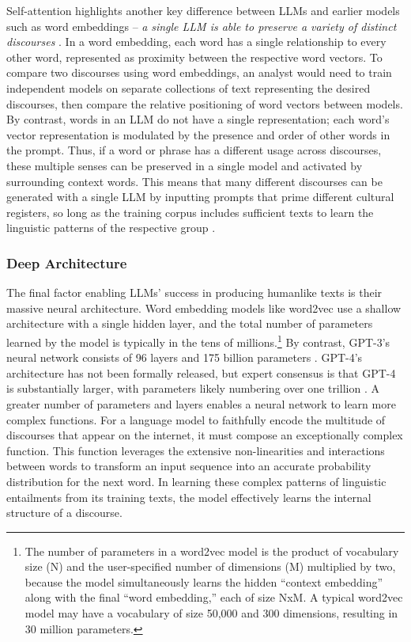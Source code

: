 \documentclass{article}
\begin{document}
Self-attention highlights another key difference between LLMs and
earlier models such as word embeddings -- \emph{a} \emph{single LLM is
able to preserve a variety of distinct discourses} \parencite{Argyle2023-ii}. In a
word embedding, each word has a single relationship to every other word,
represented as proximity between the respective word vectors. To compare
two discourses using word embeddings, an analyst would need to train
independent models on separate collections of text representing the
desired discourses, then compare the relative positioning of word
vectors between models. By contrast, words in an LLM do not have a
single representation; each word's vector representation is modulated by
the presence and order of other words in the prompt. Thus, if a word or
phrase has a different usage across discourses, these multiple senses
can be preserved in a single model and activated by surrounding context
words. This means that many different discourses can be generated with a
single LLM by inputting prompts that prime different cultural registers,
so long as the training corpus includes sufficient texts to learn the
linguistic patterns of the respective group
\parencite{Argyle2023-ii}.

\subsubsection*{Deep Architecture}

The final factor enabling LLMs' success in producing humanlike texts is
their massive neural architecture. Word embedding models like word2vec
use a shallow architecture with a single hidden layer, and the total
number of parameters learned by the model is typically in the tens of
millions.\footnote{The number of parameters in a word2vec model is the
  product of vocabulary size (N) and the user-specified number of
  dimensions (M) multiplied by two, because the model simultaneously
  learns the hidden ``context embedding'' along with the final ``word
  embedding,'' each of size NxM. A typical word2vec model may have a
  vocabulary of size 50,000 and 300 dimensions, resulting in 30 million
  parameters.} By contrast, GPT-3's neural network consists of 96 layers
and 175 billion parameters
\parencite{Brown2020-nh}. GPT-4's
architecture has not been formally released, but expert consensus is
that GPT-4 is substantially larger, with parameters likely numbering
over one trillion \parencite{OpenAI2023-kd}. A greater number of parameters and layers enables a neural
network to learn more complex functions. For a language model to
faithfully encode the multitude of discourses that appear on the
internet, it must compose an exceptionally complex function. This
function leverages the extensive non-linearities and interactions
between words to transform an input sequence into an accurate
probability distribution for the next word. In learning these complex
patterns of linguistic entailments from its training texts, the model
effectively learns the internal structure of a discourse.
\end{document}
